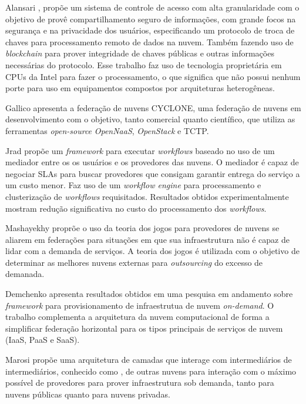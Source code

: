 Alansari \cite{ACS_Federation_7980160}, propõe um sistema de controle de acesso com alta granularidade com o objetivo de provê compartilhamento seguro de informações, com grande focos na segurança e na privacidade dos usuários, especificando um protocolo de troca de chaves para processamento remoto de dados na nuvem. Também fazendo uso de \textit{blockchain} para prover integridade de chaves públicas e outras informações necessárias do protocolo. Esse trabalho faz uso de tecnologia proprietária em \acrshort{CPU}s da Intel para fazer o processamento, o que significa que não possui nenhum porte para uso em equipamentos compostos por arquiteturas heterogêneas.

Gallico \cite{CYCLONE_7776591} apresenta a federação de nuvens CYCLONE, uma federação de nuvens em desenvolvimento com o objetivo, tanto comercial quanto científico, que utiliza as ferramentas \textit{open-source} \textit{OpenNaaS}\cite{OpenNaaS}, \textit{OpenStack}\cite{OpenStack} e \acrfull{TCTP}\cite{6735419}.

Jrad \cite{Jrad:2013:BFM:2462326.2462339} propõe um \textit{framework} para executar \textit{workflows} baseado no uso de um mediador entre os os usuários e os provedores das nuvens. O mediador é capaz de negociar \acrshort{SLA}s para buscar provedores que consigam garantir entrega do serviço a um custo menor. Faz uso de um \textit{workflow engine} para processamento e clusterização de \textit{workflows} requisitados. Resultados obtidos experimentalmente mostram redução significativa no custo do processamento dos \textit{workflows}.

Mashayekhy \cite{6853386} proprõe o uso da teoria dos jogos para provedores de nuvens se aliarem em federações para situações em que sua infraestrutura não é capaz de lidar com a demanda de serviços. A teoria dos jogos é utilizada com o objetivo de determinar as melhores nuvens externas para \textit{outsourcing} do excesso de demanada.

Demchenko \cite{6427607} apresenta resultados obtidos em uma pesquisa em andamento sobre \textit{framework} para provisionamento de infraestrutua de nuvem \textit{on-demand}. O trabalho complementa a arquitetura da nuvem computacional de forma a simplificar federação horizontal para os tipos principais de serviços de nuvem (\acrshort{IaaS}, \acrshort{PaaS} e \acrshort{SaaS}).

Marosi \cite{FCM} propõe uma arquitetura de camadas que interage com intermediários de intermediários, conhecido como \cite{meta-brokering}, de outras nuvens para interação com o máximo possível de provedores para prover infraestrutura sob demanda, tanto para nuvens públicas quanto para nuvens privadas.

